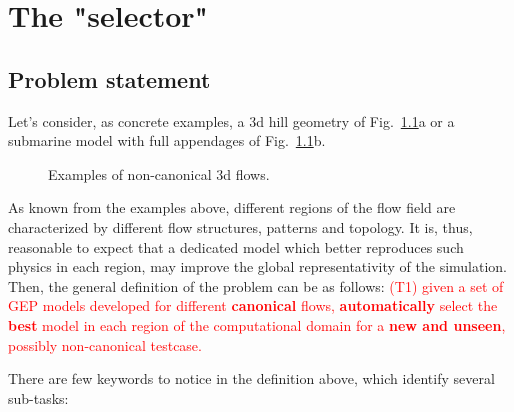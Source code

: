 \chapter{The "selector"}
\section{Problem statement}
Let's consider, as concrete examples, a 3d hill geometry of Fig.~\ref{fig:examples}a or a submarine model with full appendages of Fig.~\ref{fig:examples}b.

\begin{figure}[H]%
    \centering
    \qquad
    \caption{Examples of non-canonical 3d flows.}%
    \label{fig:examples}%
\end{figure}

\noindent As known from the examples above, different regions of the flow field are characterized by different flow structures, patterns and topology. It is, thus, reasonable to expect that a dedicated model which better reproduces such physics in each region, may improve the global representativity of the simulation. Then, the general definition of the problem can be as follows:
\textcolor{red}{(T1) given a set of GEP models developed for different \textbf{canonical} flows, \textbf{automatically} select the \textbf{best} model in each region of the computational domain for a \textbf{new and unseen}, possibly non-canonical testcase.}

\vspace{10pt}
\noindent There are few keywords to notice in the definition above, which identify several sub-tasks:
